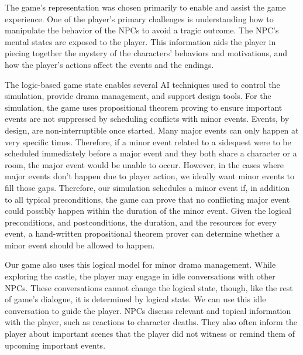 \documentclass[letterpaper]{article}
\begin{document}
The game's representation was chosen primarily to enable and assist the game experience.
One of the player's primary challenges is understanding how to manipulate the behavior of the NPCs to avoid a tragic outcome.
The NPC's mental states are exposed to the player.
This information aids the player in piecing together the mystery of the characters' behaviors and motivations, and how the player's actions affect the events and the endings.

The logic-based game state enables several AI techniques used to control the simulation, provide drama management, and support design tools.
For the simulation, the game uses propositional theorem proving to ensure important events are not suppressed by scheduling conflicts with minor events.
Events, by design, are non-interruptible once started.
Many major events can only happen at very specific times.
Therefore, if a minor event related to a sidequest were to be scheduled immediately before a major event and they both share a character or a room, the major event would be unable to occur.
However, in the cases where major events don't happen due to player action, we ideally want minor events to fill those gaps.
Therefore, our simulation schedules a minor event if, in addition to all typical preconditions, the game can prove that no conflicting major event could possibly happen within the duration of the minor event.
Given the logical preconditions, and postconditions, the duration, and the resources for every event, a hand-written propositional theorem prover can determine whether a minor event should be allowed to happen.

Our game also uses this logical model for minor drama management.
While exploring the castle, the player may engage in idle conversations with other NPCs.
These conversations cannot change the logical state, though, like the rest of game's dialogue, it is determined by logical state.
We can use this idle conversation to guide the player.
NPCs discuss relevant and topical information with the player, such as reactions to character deaths.
They also often inform the player about important scenes that the player did not witness or remind them of upcoming important events.
\end{document}
